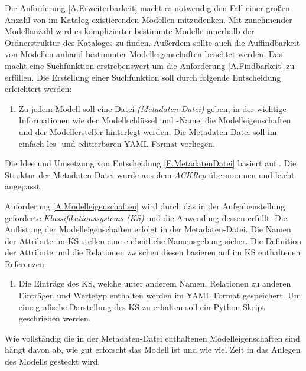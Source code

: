Die Anforderung \ref{A.Erweiterbarkeit} macht es notwendig den Fall einer großen Anzahl von im Katalog existierenden Modellen mitzudenken. Mit zunehmender Modellanzahl wird es komplizierter bestimmte Modelle innerhalb der Ordnerstruktur des Kataloges zu finden. Außerdem sollte auch die Auffindbarkeit von Modellen anhand bestimmter Modelleigenschaften beachtet werden. Das macht eine Suchfunktion erstrebenswert um die Anforderung \ref{A.Findbarkeit} zu erfüllen. Die Erstellung einer Suchfunktion soll durch folgende Entscheidung erleichtert werden:
\begin{enumerate}[label=\textbf{Entscheidung E.\arabic*}:, ref=\textbf{E.\arabic*}, wide=0pt, leftmargin=*]
	\item \label{E.MetadatenDatei}Zu jedem Modell soll eine Datei \textit{(Metadaten-Datei)} geben, in der wichtige Informationen wie der Modellschlüssel und -Name, die Modelleigenschaften und der Modellersteller hinterlegt werden. Die Metadaten-Datei soll im einfach les- und editierbaren YAML Format vorliegen.
\end{enumerate}
Die Idee und Umsetzung von Entscheidung \ref{E.MetadatenDatei} basiert auf \cite{KNHE20a}. Die Struktur der Metadaten-Datei wurde aus dem \textit{ACKRep} übernommen und leicht angepasst.

Anforderung \ref{A.Modelleigenschaften} wird durch das in der Aufgabenstellung geforderte \textit{Klassifikationssystems (KS)} und die Anwendung dessen erfüllt. Die Auflistung der Modelleigenschaften erfolgt in der Metadaten-Datei. Die Namen der Attribute im KS stellen eine einheitliche Namensgebung sicher. Die Definition der Attribute und die Relationen zwischen diesen basieren auf im KS enthaltenen Referenzen.
\begin{enumerate}[resume*]
	\item Die Einträge des KS, welche unter anderem Namen, Relationen zu anderen Einträgen und Wertetyp enthalten werden im YAML Format gespeichert. Um eine grafische Darstellung des KS zu erhalten soll ein Python-Skript geschrieben werden.
\end{enumerate}
Wie vollständig die in der Metadaten-Datei enthaltenen Modelleigenschaften sind hängt davon ab, wie gut erforscht das Modell ist und wie viel Zeit in das Anlegen des Modells gesteckt wird.

